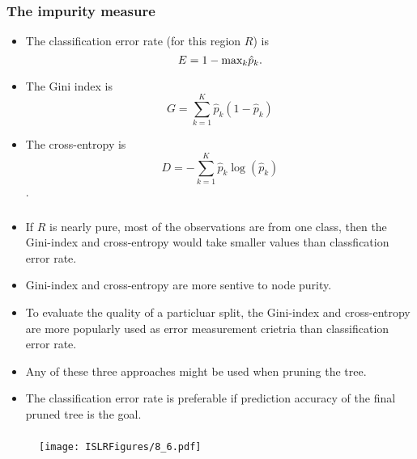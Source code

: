 \documentclass{beamer}
\begin{document}
                	\begin{frame}
                		\frametitle{The impurity measure}
                		\begin{itemize}
                		
                		
                		\item  The classification error rate (for this region $R$) is 
                		$$ E = 1 - \hbox{max}_k \hat p_k.$$
                		\item The Gini index is 
                		$$ G = \sum_{k=1}^K \hat p_k (1- \hat p_k)$$
                		\item  The cross-entropy is 
                		$$ D = - \sum_{k=1}^K \hat p_k \log (\hat p_k)$$.
                		 
                		
                	\end{itemize}
                \end{frame} 
       \begin{frame}
       	
       	\frametitle{ }
       	\begin{itemize}
       		\item  If $R$ is nearly pure, most of the observations 
       		are from one class, then 
       		the Gini-index and cross-entropy would take smaller values than classfication error rate.
       		 
       		\item   Gini-index and cross-entropy are more sentive to node purity.
       		
       		\item To evaluate the quality of a particluar split, the Gini-index and cross-entropy  are more popularly used as error measurement 
       		crietria than 
       		classification error rate. 
       		\item Any of these three approaches might be used when
       		pruning the tree.
       		
       		\item  The classification error rate is preferable if prediction
       		accuracy of the final pruned tree is the goal.
       	\end{itemize}
       \end{frame}              
                
    
  
               \begin{frame}
               	\frametitle{ }
               	\begin{figure}
               		\centering
               		
               		\centering
               		\texttt{[image: ISLRFigures/8\_6.pdf]}
               		
               	\end{figure}
               \end{frame}
               
\end{document}
